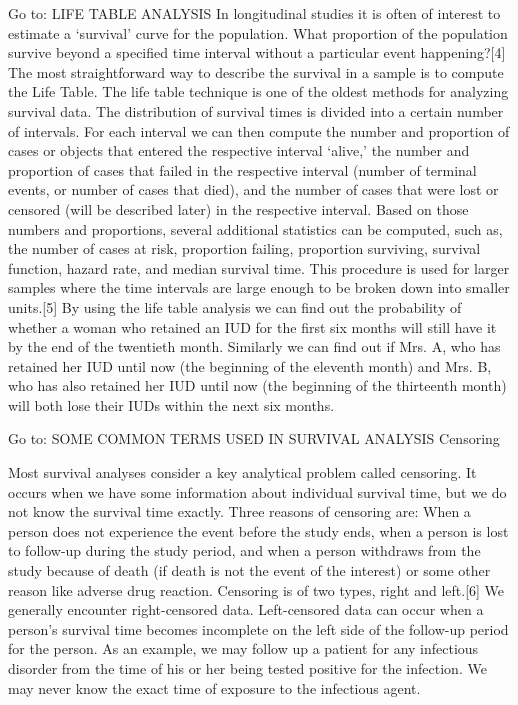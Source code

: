 Go to:
LIFE TABLE ANALYSIS
In longitudinal studies it is often of interest to estimate a ‘survival’ curve for the population. What proportion of the population survive beyond a specified time interval without a particular event happening?[4] The most straightforward way to describe the survival in a sample is to compute the Life Table. The life table technique is one of the oldest methods for analyzing survival data. The distribution of survival times is divided into a certain number of intervals. For each interval we can then compute the number and proportion of cases or objects that entered the respective interval ‘alive,’ the number and proportion of cases that failed in the respective interval (number of terminal events, or number of cases that died), and the number of cases that were lost or censored (will be described later) in the respective interval. Based on those numbers and proportions, several additional statistics can be computed, such as, the number of cases at risk, proportion failing, proportion surviving, survival function, hazard rate, and median survival time. This procedure is used for larger samples where the time intervals are large enough to be broken down into smaller units.[5] By using the life table analysis we can find out the probability of whether a woman who retained an IUD for the first six months will still have it by the end of the twentieth month. Similarly we can find out if Mrs. A, who has retained her IUD until now (the beginning of the eleventh month) and Mrs. B, who has also retained her IUD until now (the beginning of the thirteenth month) will both lose their IUDs within the next six months.

Go to:
SOME COMMON TERMS USED IN SURVIVAL ANALYSIS
Censoring

Most survival analyses consider a key analytical problem called censoring. It occurs when we have some information about individual survival time, but we do not know the survival time exactly. Three reasons of censoring are: When a person does not experience the event before the study ends, when a person is lost to follow-up during the study period, and when a person withdraws from the study because of death (if death is not the event of the interest) or some other reason like adverse drug reaction. Censoring is of two types, right and left.[6] We generally encounter right-censored data. Left-censored data can occur when a person's survival time becomes incomplete on the left side of the follow-up period for the person. As an example, we may follow up a patient for any infectious disorder from the time of his or her being tested positive for the infection. We may never know the exact time of exposure to the infectious agent.

